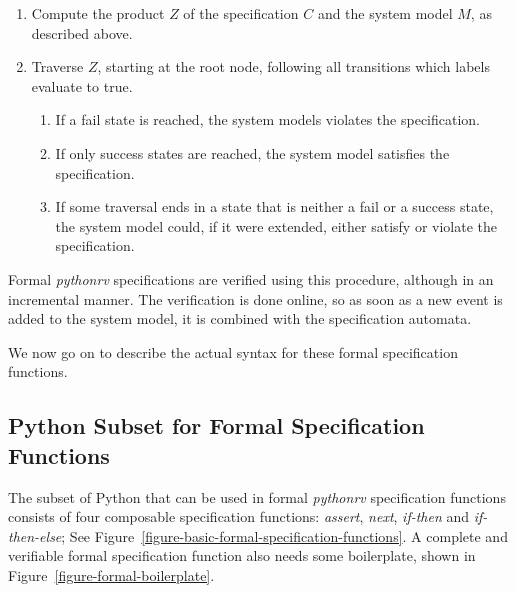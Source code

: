 \begin{enumerate}
  \item Compute the product $Z$ of the specification $C$ and the system model
    $M$, as described above.

  \item Traverse $Z$, starting at the root node, following all transitions
    which labels evaluate to true.

    \begin{enumerate}
      \item If a fail state is reached, the system models violates the
        specification.
      \item If only success states are reached, the system model satisfies the
        specification.
      \item If some traversal ends in a state that is neither a fail or a
        success state, the system model could, if it were extended, either
        satisfy or violate the specification.
    \end{enumerate}
\end{enumerate}

Formal \textit{pythonrv} specifications are verified using this procedure,
although in an incremental manner. The verification is done online, so as soon
as a new event is added to the system model, it is combined with the
specification automata.

We now go on to describe the actual syntax for these formal specification
functions.


\subsection{Python Subset for Formal Specification Functions}
\label{section-approach-python-subset}
\lstset{language=Python,numbers=left}

The subset of Python that can be used in formal \textit{pythonrv} specification
functions consists of four composable specification functions:
\textit{assert}, \textit{next}, \textit{if-then} and \textit{if-then-else}; See
Figure~\ref{figure-basic-formal-specification-functions}. A complete and
verifiable formal specification function also needs some boilerplate, shown in
Figure~\ref{figure-formal-boilerplate}.

